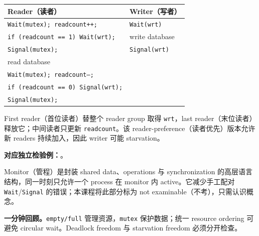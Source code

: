 \begin{center}
\small
\begin{tabularx}{0.94\textwidth}{@{}XX@{}}
  \toprule
  Reader（读者） & Writer（写者） \\
  \midrule
  \texttt{Wait(mutex); readcount++;} & \texttt{Wait(wrt)} \\
  \texttt{if (readcount == 1) Wait(wrt);} & write database \\
  \texttt{Signal(mutex);} & \texttt{Signal(wrt)} \\
  read database & \\
  \texttt{Wait(mutex); readcount--;} & \\
  \texttt{if (readcount == 0) Signal(wrt);} & \\
  \texttt{Signal(mutex);} & \\
  \bottomrule
\end{tabularx}
\end{center}

First reader（首位读者）替整个 reader group 取得 \texttt{wrt}，last reader（末位读者）释放它；中间读者只更新 \texttt{readcount}。该 reader-preference（读者优先）版本允许新 readers 持续加入，因此 writer 可能 starvation。

\textbf{对应独立检验例：}。


Monitor（管程）是封装 shared data、operations 与 synchronization 的高层语言结构，同一时刻只允许一个 process 在 monitor 内 active。它减少手工配对 \texttt{Wait}/\texttt{Signal} 的错误；本课程将此部分标为 not examinable（不考），只需认识概念。

\textbf{一分钟回顾。}\texttt{empty/full} 管理资源，\texttt{mutex} 保护数据；统一 resource ordering 可避免 circular wait。Deadlock freedom 与 starvation freedom 必须分开检查。
